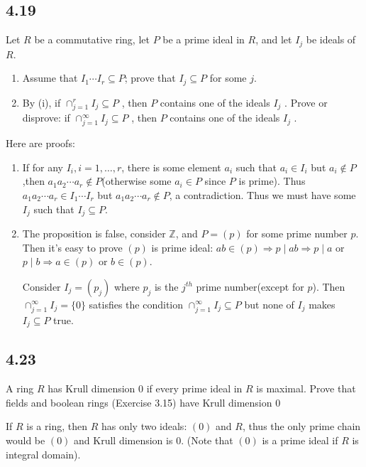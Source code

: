 \documentclass[a4paper, pdf, 12pt]{article}
\makeatletter
\renewenvironment{proof}[1][\proofname]{\par
  \pushQED{\qed}%
  \normalfont \topsep6\p@\@plus6\p@\relax
  \trivlist
  \item[%
    \hskip\labelsep
    \normalfont\bfseries %
    #1%
    \@addpunct{.}%
  ]\ignorespaces
}{%
  \popQED\endtrivlist\@endpefalse
}
\let\qed\relax %
\DeclareRobustCommand{\qed}{%
  \ifmmode \mathqed
  \else
    \leavevmode\unskip\penalty\@M\hbox{}\nobreak\hspace{.5em minus .1em}%
    \hbox{\qedsymbol}%
  \fi
}
\makeatother
\begin{document}
\subsection*{4.19}
Let $R$ be a commutative ring, let $P$ be a prime ideal in $R$, and let $I_j$ be ideals 
of $R$.
\begin{enumerate} [leftmargin=0.6cm,itemindent=.2cm,labelwidth=\itemindent,labelsep=0.2cm,align=right,label=(\roman*)]
\item Assume that $I_1\cdots I_r \subseteq P$; prove that $I_j \subseteq P$ for some $j$.
\item By (i), if $\cap_{j=1}^{r}I_j\subseteq P$ , then $P$ contains one of the ideals $I_j$ . Prove or disprove:
if $\cap_{j=1}^{\infty}I_j\subseteq P$ , then $P$ contains one of the ideals $I_j$ .
\end{enumerate}

\begin{proof}
  Here are proofs:
\begin{enumerate} [leftmargin=0.6cm,itemindent=.2cm,labelwidth=\itemindent,labelsep=0.2cm,align=right,label=(\roman*)]
  \item If for any $I_{i}, i=1,\ldots, r$, there is some element $a_{i}$ such that $a_{i}\in I_{i}$ but $a_{i}\notin P$
  ,then $a_1a_2\cdots a_{r}\notin P$(otherwise some $a_{i}\in P$ since $P$ is prime). Thus 
  $a_1a_2\cdots a_{r}\in I_{1}\cdots I_{r}$ but $a_1a_2\cdots a_{r}\notin P$, a contradiction. Thus we must 
  have some $I_{j}$ such that $I_{j}\subseteq P$.
  \item The proposition is false, consider $\mathbb{Z}$, and $P = (p)$ for some prime number $p$. Then it's 
  easy to prove $(p)$ is prime ideal: $ab\in (p)\Rightarrow p\mid ab\Rightarrow p\mid a$ or $p\mid b\Rightarrow a\in (p)$
  or $b\in (p)$.

  Consider $I_j = (p_j)$ where $p_{j}$ is the $j^{th}$ prime number(except for $p$). Then $\cap_{j=1}^{\infty}I_j=\{0\}$ satisfies the 
  condition $\cap_{j=1}^{\infty}I_{j}\subseteq P$ but none of $I_{j}$ makes $I_{j}\subseteq P$ true.
\end{enumerate}
\end{proof}

\subsection*{4.23}
A ring $R$ has Krull dimension 0 if every prime ideal in $R$ is maximal. Prove that ﬁelds and boolean rings 
(Exercise 3.15) have Krull dimension 0
\begin{proof}
  If $R$ is a ring, then $R$ has only two ideals: $(0)$ and $R$, thus the only prime chain would be 
  $(0)$ and Krull dimension is 0. (Note that $(0)$ is a prime ideal if $R$ is integral domain).
\end{proof}
\end{document}
